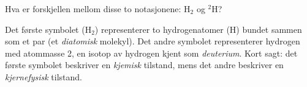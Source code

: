 

Hva er forskjellen mellom disse to notasjonene: H$_{2}$ og $^{2}$H?







Det første symbolet (H$_{2}$) representerer to hydrogenatomer (H) bundet sammen som et par (et {\it diatomisk} molekyl). Det andre symbolet representerer hydrogen med atommasse 2, en isotop av hydrogen kjent som {\it deuterium}. Kort sagt: det første symbolet beskriver en {\it kjemisk} tilstand, mens det andre beskriver en {\it kjernefysisk} tilstand.










